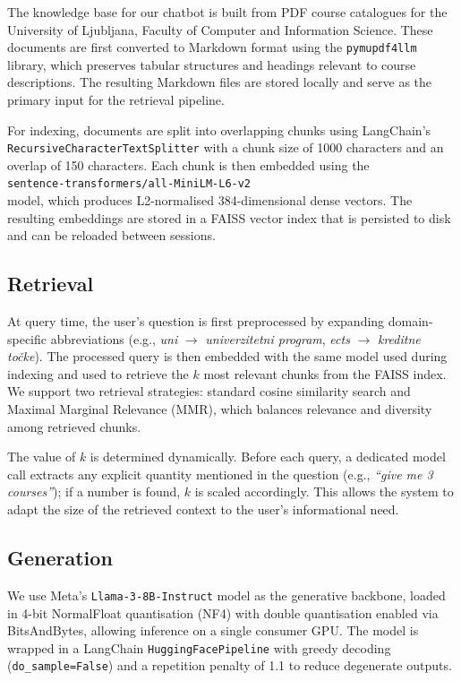 \documentclass[fleqn,moreauthors,10pt]{ds_report}
\begin{document}
The knowledge base for our chatbot is built from PDF course catalogues for the University of Ljubljana, Faculty of Computer and Information Science. These documents are first converted to Markdown format using the \texttt{pymupdf4llm} library, which preserves tabular structures and headings relevant to course descriptions. The resulting Markdown files are stored locally and serve as the primary input for the retrieval pipeline.

For indexing, documents are split into overlapping chunks using LangChain's \\ \texttt{RecursiveCharacterTextSplitter} with a chunk size of 1000 characters and an overlap of 150 characters. Each chunk is then embedded using the \\ \texttt{sentence-transformers/all-MiniLM-L6-v2} \\ model, which produces L2-normalised 384-dimensional dense vectors. The resulting embeddings are stored in a FAISS vector index that is persisted to disk and can be reloaded between sessions.

\subsection*{Retrieval}

At query time, the user's question is first preprocessed by expanding domain-specific abbreviations (e.g., \textit{uni} $\rightarrow$ \textit{univerzitetni program}, \textit{ects} $\rightarrow$ \textit{kreditne točke}). The processed query is then embedded with the same model used during indexing and used to retrieve the $k$ most relevant chunks from the FAISS index. We support two retrieval strategies: standard cosine similarity search and Maximal Marginal Relevance (MMR), which balances relevance and diversity among retrieved chunks.

The value of $k$ is determined dynamically. Before each query, a dedicated model call extracts any explicit quantity mentioned in the question (e.g., \textit{``give me 3 courses''}); if a number is found, $k$ is scaled accordingly. This allows the system to adapt the size of the retrieved context to the user's informational need.

\subsection*{Generation}

We use Meta's \texttt{Llama-3-8B-Instruct} model as the generative backbone, loaded in 4-bit NormalFloat quantisation (NF4) with double quantisation enabled via BitsAndBytes, allowing inference on a single consumer GPU. The model is wrapped in a LangChain \texttt{HuggingFacePipeline} with greedy decoding (\texttt{do\_sample=False}) and a repetition penalty of 1.1 to reduce degenerate outputs.
\end{document}
